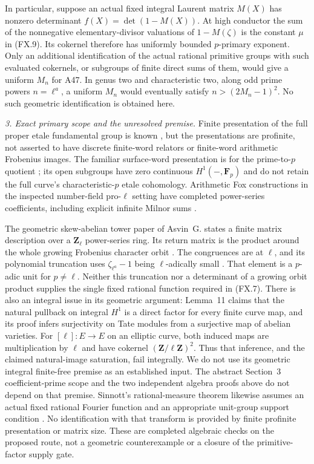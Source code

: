 \documentclass[11pt,a4paper]{article}
\begin{document}
In particular, suppose an actual fixed integral Laurent matrix
$M(X)$ has nonzero determinant $f(X)=\det(1-M(X))$.
At high conductor the sum of the nonnegative elementary-divisor
valuations of $1-M(\zeta)$ is the constant $\mu$ in (FX.9).
Its cokernel therefore has uniformly bounded $p$-primary exponent.
Only an additional identification of the actual rational primitive
groups with such evaluated cokernels, or subgroups of finite direct
sums of them, would give a uniform $M_n$ for A47. In genus two and
characteristic two, along odd prime powers $n=\ell^a$, a uniform
$M_n$ would eventually satisfy $n>(2M_n-1)^2$.
No such geometric identification is obtained here.

\emph{3. Exact primary scope and the unresolved premise.}
Finite presentation of the full proper etale fundamental group is
known \cite[Theorem~1.1]{ESS2022}
\cite[Theorem~1.1 and Corollary~1.2]{Shusterman2022}, but the
presentations are profinite, not asserted to have discrete finite-word
relators or finite-word arithmetic Frobenius images. The familiar
surface-word presentation is for the prime-to-$p$ quotient
\cite[p.~4]{ESS2022}; its open subgroups have zero continuous
$H^1(-,\mathbf F_p)$ and do not retain the full curve's
characteristic-$p$ etale cohomology. Arithmetic Fox constructions in
the inspected number-field pro-$\ell$ setting have completed
power-series coefficients, including explicit infinite Milnor sums
\cite[Sections~4.1--4.3, Proposition~4.3.4]{KMT2017}.

The geometric skew-abelian tower paper of Asvin~G. states a finite
matrix description over a $\mathbf Z_\ell$ power-series ring.
Its return matrix is the product
around the whole growing Frobenius character orbit
\cite[Definition~8, Lemma~17, Section~3.1, equation~(6)]{Asvin2023}.
The congruences are at $\ell$, and its polynomial truncation uses
$\zeta_{\ell^a}-1$ being $\ell$-adically small
\cite[Theorems~23,26 and Section~3.3, p.~2169]{Asvin2023}.
That element is a $p$-adic unit for $p\ne\ell$. Neither this
truncation nor a determinant of a growing orbit product supplies
the single fixed rational function required in (FX.7).
There is also an integral issue in its geometric argument:
Lemma~11 claims that the natural pullback on integral $H^1$
is a direct factor for every finite curve map, and its proof
infers surjectivity on Tate modules from a surjective map of
abelian varieties. For
$[\ell]:E\to E$ on an elliptic curve, both induced maps are
multiplication by $\ell$ and have cokernel
$(\mathbf Z/\ell\mathbf Z)^2$. Thus that inference, and the
claimed natural-image saturation, fail integrally. We do not
use its geometric integral finite-free premise as an established
input. The abstract Section~3 coefficient-prime scope and the
two independent algebra proofs above do not depend on that premise.
Sinnott's rational-measure theorem likewise assumes an actual fixed
rational Fourier function and an appropriate unit-group support
condition \cite[Section~1.16 and Theorem~3.2]{Sinnott1987}.
No identification with that transform is provided by finite
profinite presentation or matrix size. These are completed
algebraic checks on the proposed route, not a geometric
counterexample or a closure of the primitive-factor supply gate.
\end{document}
